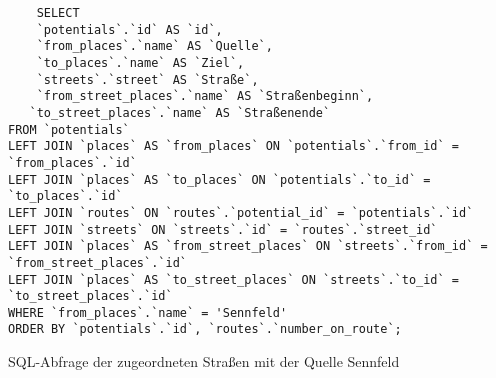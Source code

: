 \begin{listing}[htbp]
\begin{verbatim}
    SELECT 
	`potentials`.`id` AS `id`,
	`from_places`.`name` AS `Quelle`, 
	`to_places`.`name` AS `Ziel`,
	`streets`.`street` AS `Straße`,
	`from_street_places`.`name` AS `Straßenbeginn`,
   `to_street_places`.`name` AS `Straßenende`
FROM `potentials`
LEFT JOIN `places` AS `from_places` ON `potentials`.`from_id` = `from_places`.`id`
LEFT JOIN `places` AS `to_places` ON `potentials`.`to_id` = `to_places`.`id`
LEFT JOIN `routes` ON `routes`.`potential_id` = `potentials`.`id`
LEFT JOIN `streets` ON `streets`.`id` = `routes`.`street_id`
LEFT JOIN `places` AS `from_street_places` ON `streets`.`from_id` = `from_street_places`.`id`
LEFT JOIN `places` AS `to_street_places` ON `streets`.`to_id` = `to_street_places`.`id`
WHERE `from_places`.`name` = 'Sennfeld'
ORDER BY `potentials`.`id`, `routes`.`number_on_route`;
\end{verbatim}
\caption{SQL-Abfrage der zugeordneten Straßen mit der Quelle Sennfeld}\label{lst-rt-sennfeld}
\end{listing}



